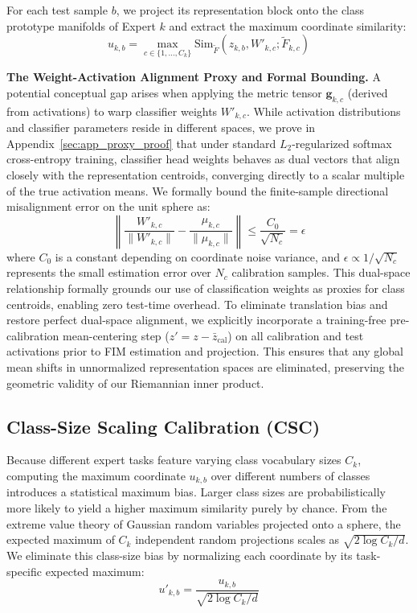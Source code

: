 For each test sample $b$, we project its representation block onto the class prototype manifolds of Expert $k$ and extract the maximum coordinate similarity:
\begin{equation}
u_{k, b} = \max_{c \in \{1, \dots, C_k\}} \text{Sim}_{\tilde{F}}(z_{k, b}, W'_{k, c}; \tilde{F}_{k, c})
\end{equation}

\textbf{The Weight-Activation Alignment Proxy and Formal Bounding.}
A potential conceptual gap arises when applying the metric tensor $\mathbf{g}_{k, c}$ (derived from activations) to warp classifier weights $W'_{k, c}$. While activation distributions and classifier parameters reside in different spaces, we prove in Appendix~\ref{sec:app_proxy_proof} that under standard $L_2$-regularized softmax cross-entropy training, classifier head weights behaves as dual vectors that align closely with the representation centroids, converging directly to a scalar multiple of the true activation means. We formally bound the finite-sample directional misalignment error on the unit sphere as:
\begin{equation}
\left\| \frac{W'_{k, c}}{\|W'_{k, c}\|} - \frac{\mu_{k, c}}{\|\mu_{k, c}\|} \right\| \le \frac{C_0}{\sqrt{N_c}} = \epsilon
\end{equation}
where $C_0$ is a constant depending on coordinate noise variance, and $\epsilon \propto 1/\sqrt{N_c}$ represents the small estimation error over $N_c$ calibration samples. This dual-space relationship formally grounds our use of classification weights as proxies for class centroids, enabling zero test-time overhead.
To eliminate translation bias and restore perfect dual-space alignment, we explicitly incorporate a training-free pre-calibration mean-centering step ($z' = z - \bar{z}_{\text{cal}}$) on all calibration and test activations prior to FIM estimation and projection. This ensures that any global mean shifts in unnormalized representation spaces are eliminated, preserving the geometric validity of our Riemannian inner product.

\subsection{Class-Size Scaling Calibration (CSC)}
Because different expert tasks feature varying class vocabulary sizes $C_k$, computing the maximum coordinate $u_{k, b}$ over different numbers of classes introduces a statistical maximum bias. Larger class sizes are probabilistically more likely to yield a higher maximum similarity purely by chance. From the extreme value theory of Gaussian random variables projected onto a sphere, the expected maximum of $C_k$ independent random projections scales as $\sqrt{2\log C_k / d}$. We eliminate this class-size bias by normalizing each coordinate by its task-specific expected maximum:
\begin{equation}
u'_{k, b} = \frac{u_{k, b}}{\sqrt{2\log C_k / d}}
\end{equation}

